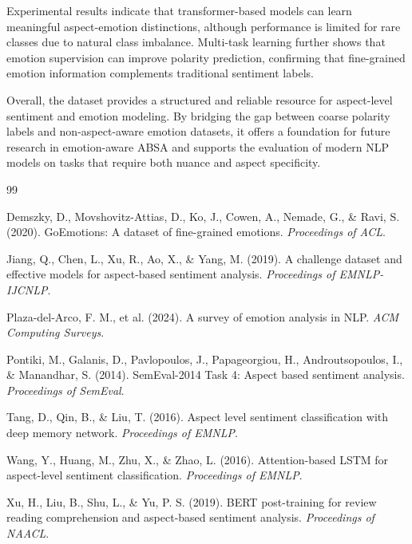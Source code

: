 \documentclass[10pt]{article}
\begin{document}
Experimental results indicate that transformer-based models can learn meaningful aspect-emotion distinctions, although performance is limited for rare classes due to natural class imbalance. Multi-task learning further shows that emotion supervision can improve polarity prediction, confirming that fine-grained emotion information complements traditional sentiment labels.

Overall, the dataset provides a structured and reliable resource for aspect-level sentiment and emotion modeling. By bridging the gap between coarse polarity labels and non-aspect-aware emotion datasets, it offers a foundation for future research in emotion-aware ABSA and supports the evaluation of modern NLP models on tasks that require both nuance and aspect specificity.

\newpage

\begin{thebibliography}{99}

Demszky, D., Movshovitz-Attias, D., Ko, J., Cowen, A., Nemade, G., \& Ravi, S. (2020).
GoEmotions: A dataset of fine-grained emotions.
\textit{Proceedings of ACL}.

Jiang, Q., Chen, L., Xu, R., Ao, X., \& Yang, M. (2019).
A challenge dataset and effective models for aspect-based sentiment analysis.
\textit{Proceedings of EMNLP-IJCNLP}.

Plaza-del-Arco, F. M., et al. (2024).
A survey of emotion analysis in NLP.
\textit{ACM Computing Surveys}.

Pontiki, M., Galanis, D., Pavlopoulos, J., Papageorgiou, H., Androutsopoulos, I., \& Manandhar, S. (2014).
SemEval-2014 Task 4: Aspect based sentiment analysis.
\textit{Proceedings of SemEval}.

Tang, D., Qin, B., \& Liu, T. (2016).
Aspect level sentiment classification with deep memory network.
\textit{Proceedings of EMNLP}.

Wang, Y., Huang, M., Zhu, X., \& Zhao, L. (2016).
Attention-based LSTM for aspect-level sentiment classification.
\textit{Proceedings of EMNLP}.

Xu, H., Liu, B., Shu, L., \& Yu, P. S. (2019).
BERT post-training for review reading comprehension and aspect-based sentiment analysis.
\textit{Proceedings of NAACL}.

\end{thebibliography}
\end{document}
